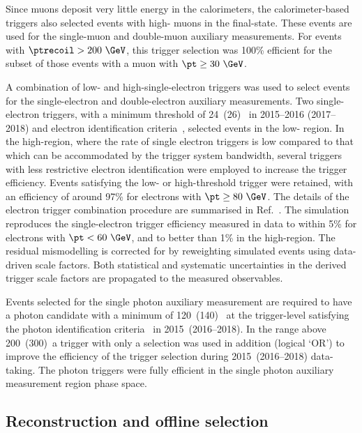 \documentclass[atlasdraft=false, cernpreprint, UKenglish, texmf, orcidlogo]{atlasdoc}
\begin{document}
Since muons deposit very little energy in the calorimeters, the calorimeter-based \ptmiss triggers also selected events with high-\pt
muons in the final-state.
These events are  used for the  single-muon and double-muon auxiliary measurements.
For events with $\ptrecoil>200~\GeV$, this trigger selection 
was 100\% efficient for the subset of those events with a muon with \( \pt \ge 30~\GeV\).
 
A combination of low- and high-\pt single-electron triggers was used to select events for the single-electron and double-electron auxiliary
measurements.
Two  single-electron triggers, with a minimum \pt threshold of 24~(26)~\GeV{} in 2015--2016 (2017--2018)
and \tightID electron identification criteria~\cite{TRIG-2018-05}, selected events in the low-\pt{} region.
In the high-\pt region, where the rate of single electron triggers is low compared to that which can be accommodated by the trigger system bandwidth,
several triggers with less restrictive electron identification were employed to increase the trigger efficiency.
Events satisfying the low- or high-\pt threshold trigger were retained, with an efficiency of around 97\% for electrons with \(\pt\ge80~\GeV\).
The details of the electron trigger combination procedure are summarised in Ref.~\cite{TRIG-2018-05}.
The simulation reproduces the single-electron trigger efficiency measured in data to within 5\% for electrons with \(\pt< 60~\GeV\),
and to better than 1\% in the high-\pt region.
The residual mismodelling is corrected for by reweighting simulated events using data-driven scale factors.
Both statistical and systematic uncertainties in the derived trigger scale factors are propagated to the measured observables.
 
Events selected for the single photon auxiliary measurement are required to have a photon candidate with a minimum \pt of 120~(140)~\GeV{}
at the trigger-level satisfying the \looseID photon identification criteria~\cite{TRIG-2018-05} in 2015~(2016--2018).
In the \pt range above 200~(300)~\GeV a trigger with only a \pt selection was used in addition
(logical `OR') to improve the efficiency of the trigger selection during
2015~(2016--2018) data-taking.
The photon triggers were fully efficient in the single photon auxiliary measurement region phase space.
 
\subsection{Reconstruction and offline selection}
\label{sec:recosel}
 
\end{document}

